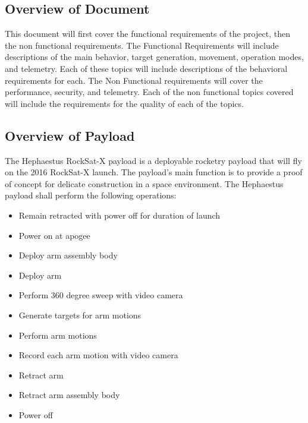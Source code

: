 \documentclass[letterpaper,10pt]{article}
\begin{document}
\subsection{Overview of Document}
This document will first cover the functional requirements of the project, then the non functional requirements.
The Functional Requirements will include descriptions of the main behavior, target generation, movement, operation modes, and telemetry.
Each of these topics will include descriptions of the behavioral requirements for each.
The Non Functional requirements will cover the performance, security, and telemetry.
Each of the non functional topics covered will include the requirements for the quality of each of the topics.

\subsection{Overview of Payload}
The Hephaestus RockSat-X payload is a deployable rocketry payload that will fly on the 2016 RockSat-X launch.
The payload's main function is to provide a proof of concept for delicate construction in a space environment.
The Hephaestus payload shall perform the following operations:
\begin{itemize}
\item{Remain retracted with power off for duration of launch}
\item{Power on at apogee}
\item{Deploy arm assembly body}
\item{Deploy arm}
\item{Perform 360 degree sweep with video camera}
\item{Generate targets for arm motions}
\item{Perform arm motions}
\item{Record each arm motion with video camera}
\item{Retract arm}
\item{Retract arm assembly body}
\item{Power off}
\end{itemize}
\end{document}
